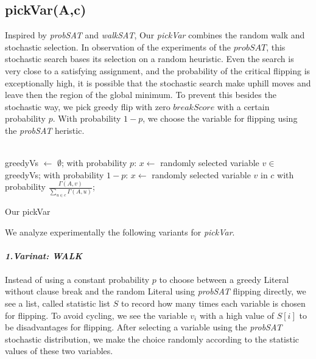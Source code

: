 \documentclass[12pt,a4paper,twoside]{scrartcl}
\numberwithin{equation}{section}
\begin{document}
\subsection{pickVar(A,c)}
Inspired by \emph{probSAT} and \emph{walkSAT}, Our \emph{pickVar} combines the random walk and stochastic selection. 
In observation of the experiments of the $probSAT$, this stochastic search bases its selection on a random heuristic.  Even the search is very close to a satisfying assignment, and the probability of the critical flipping is exceptionally high, it is possible that the stochastic search make uphill moves and leave then the region of the global minimum. To prevent this besides the stochastic way,  we pick greedy flip with zero $breakScore$ with a certain probability $p$. With probability $1-p$, we choose the variable for flipping using the \emph{probSAT} heristic.\\
\\
\begin{algorithm}[H]
 greedyVs $\leftarrow$ $\emptyset$;\;
  with probability $p$: $x \leftarrow$ randomly selected variable $v \in$ greedyVs;  \;
  with probability $1-p$:   $x \leftarrow$ randomly selected  variable $v$ in $c$ with probability $\frac{\Gamma(A,v)}{\sum_{u \in c}\Gamma(A,u)}$;  
\caption{Our pickVar}
\end{algorithm}  
We analyze experimentally the following variants for  \emph{pickVar}.\\
\\ 
 \emph{\textbf{1.Varinat: WALK}}\\
\\
Instead of using a constant probability $p$ to choose between a greedy Literal without clause break and the random Literal using \emph{probSAT} flipping directly, we see a list, called statistic list $S$ to record how many times each variable is chosen for flipping.  To avoid cycling, we see the variable $v_i$ with a high value of $S[i]$ to be disadvantages for flipping. After selecting a variable using the \emph{probSAT} stochastic distribution, we make the choice randomly according to the statistic values of these two variables.\\
 \\
\end{document}
